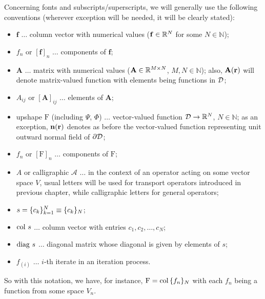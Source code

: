 Concerning fonts and subscripts/superscripts, we will generally use the following conventions (wherever exception will
be needed, it will be clearly stated):
\begin{itemize}
  \item $\mathbf{f}$ $\ldots$ column vector with numerical values ($\mathbf{f}\in\R[N]$ for some $N\in\mathbb{N}$);
  \item $f_n$ or $[\mathbf{f}]_n$ $\ldots$ components of $\mathbf{f}$;
  \item $\mathbf{A}$ $\ldots$ matrix with numerical values ($\mathbf{A}\in\R[M\times N]$, $M,N\in\mathbb{N}$);
  also, $\mathbf{A}(\br)$ will denote matrix-valued function with elements being functions in $\VV$;
  \item $A_{ij}$ or $[\mathbf{A}]_{ij}$ $\ldots$ elements of $\mathbf{A}$;
  \item upshape $\mathrm{F}$ (including $\Psi$, $\Phi$) $\ldots$ vector-valued function $\VV\to\R[N]$,
  $N\in\mathbb{N}$; as an exception, $\bn(\br)$ denotes as before the vector-valued function representing unit outward
  normal field of $\pV$;
  \item $f_n$ or $[\mathrm{F}]_n$ $\ldots$ components of $\mathrm{F}$;
  \item $A$ or calligraphic $\mathcal{A}$ $\ldots$ in the context of an operator acting on some vector space $V$, usual
  letters will be used for transport operators introduced in previous chapter, while calligraphic letters for general  
  operators;
  \item $s = \{c_k\}_{k=1}^N \equiv \{c_k\}_\idxset{N}$;
  \item $\col s$ $\ldots$ column vector with entries $c_1,c_2,\ldots,c_N$;
  \item $\diag s$ $\ldots$ diagonal matrix whose diagonal is given by elements of $s$;
  \item $f_{(i)}$ $\ldots$ $i$-th iterate in an iteration process.
\end{itemize}
So with this notation, we have, for instance, $\mathrm{F} = \col \{f_n\}_N$ with each $f_n$ being a function from some
space $V_n$.
\mbox{}\\

